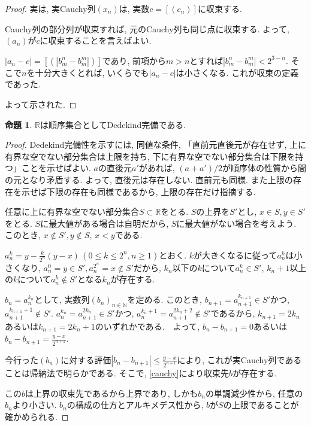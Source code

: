 \documentclass[a4paper, twoside]{bxjsarticle}
\newcommand{\nat}{\mathbb{N}}
\newcommand{\rea}{\mathbb{R}}
\newcommand{\abs}[1]{\left\lvert#1\right\rvert}
\theoremstyle{definition}
\newtheorem{prop}[thm]{命題}
\begin{document}
\begin{proof}
            実は, 実Cauchy列$(x_n)$は, 実数$c=[(c_n)]$に収束する.
            \begin{framed}
                Cauchy列の部分列が収束すれば, 元のCauchy列も同じ点に収束する. よって, $(a_n)$が$c$に収束することを言えばよい.
                
                $\abs{a_n-c}=[(\abs{b_m^n-b_m^m})]$であり, 前項から$m>n$とすれば$\abs{b_m^n-b_m^m}<2^{3-n}$. そこで$n$を十分大きくとれば, いくらでも$\abs{a_n-c}$は小さくなる. これが収束の定義であった.
            \end{framed}
            
            よって示された.
        \end{proof}
        \begin{prop}
            $\rea$は順序集合としてDedekind完備である.
        \end{prop}
        \begin{proof}
            Dedekind完備性を示すには, 同値な条件, 「直前元直後元が存在せず, 上に有界な空でない部分集合は上限を持ち, 下に有界な空でない部分集合は下限を持つ」ことを示せばよい. $a$の直後元$a'$があれば, $(a+a')/2$が順序体の性質から間の元となり矛盾する. よって, 直後元は存在しない. 直前元も同様. また上限の存在を示せば下限の存在も同様であるから, 上限の存在だけ指摘する. 
            
            任意に上に有界な空でない部分集合$S\subset \rea$をとる. $S$の上界を$S'$とし, $x\in S, y\in S'$をとる. $S$に最大値がある場合は自明だから, $S$に最大値がない場合を考えよう. このとき, $x\not\in S', y\not\in S$, $x<y$である.
            
            $a_n^k = y- \frac{k}{2^n}(y-x) \, (0\leq k\leq 2^n, n\geq 1)$とおく. $k$が大きくなるに従って$a_n^k$は小さくなり, $a_n^0 = y\in S', a_n^{2^n}=x\not\in S'$だから, $k_n$以下の$k$について$a_n^k\in S'$, $k_n+1$以上の$k$について$a_n^k\not\in S'$となる$k_n$が存在する.
            
            $b_n = a_n^{k_n}$として, 実数列$(b_n)_{n\in\nat}$を定める. このとき, $b_{n+1}=a_{n+1}^{k_{n+1}}\in S'$かつ, $a_{n+1}^{k_{n+1}+1}\not\in S'$. $a_n^{k_n}=a_{n+1}^{2k_n}\in S'$かつ, $a_n^{k_n+1}=a_{n+1}^{2k_n+2}\not\in S'$であるから, $k_{n+1}=2k_n$あるいは$k_{n+1}=2k_n+1$のいずれかである.　よって, $b_n-b_{n+1}=0$あるいは$b_n-b_{n+1}=\frac{y-x}{2^{n+1}}$.
            
            今行った$(b_n)$に対する評価$\abs{b_n-b_{n+1}}\leq\frac{y-x}{2^{n+1}}$により, これが実Cauchy列であることは帰納法で明らかである. そこで, \ref{cauchy}により収束先$b$が存在する.
            
            この$b$は上界の収束先であるから上界であり, しかも$b_n$の単調減少性から, 任意の$b_n$より小さい. $b_n$の構成の仕方とアルキメデス性から, $b$が$S$の上限であることが確かめられる.
        \end{proof}
\end{document}
